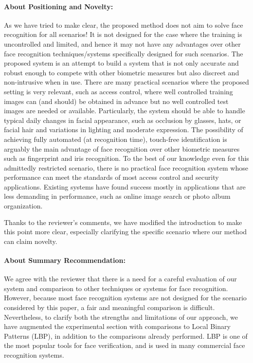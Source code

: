 \documentclass[11pt]{article}
\begin{document}
\paragraph{About Positioning and Novelty:} As we have tried to make clear, the
proposed method does not aim to solve face recognition for all scenarios! It is
not designed for the case where the training is uncontrolled and limited, and
hence it may not have any advantages over other face recognition
techniques/systems specifically designed for such scenarios.  The proposed
system is an attempt to build a system that is not only accurate and robust
enough to compete with other biometric measures but also discreet and
non-intrusive when in use. There are many practical scenarios where the
proposed setting is very relevant, such as access control, where well
controlled training images can (and should) be obtained in advance but no well
controlled test images are needed or available. Particularly, the system should
be able to handle typical daily changes in facial appearance, such as occlusion
by glasses, hats, or facial hair and variations in lighting and moderate
expression. The possibility of achieving fully automated (at recognition time),
touch-free identification is arguably the main advantage of face recognition
over other biometric measures such as fingerprint and iris recognition.  To the
best of our knowledge even for this admittedly restricted scenario, there is no
practical face recognition system whose performance can meet the standards of
most access control and security applications. Existing systems have found
success  mostly in applications that are less demanding in performance, such as
online image search or photo album organization.

Thanks to the reviewer's comments, we have modified the introduction to make this point more clear, especially clarifying the specific scenario where our method can claim novelty.

\paragraph{About Summary Recommendation:} We agree with the reviewer that there is a need for a careful evaluation of our system and comparison to other techniques or systems for face recognition. However, because most face recognition systems are not designed for the scenario considered by this paper, a fair and meaningful comparison is difficult. Nevertheless, to clarify both the strengths and limitations of our approach, we have augmented the experimental section with comparisons to Local Binary Patterns (LBP), in addition to the comparisons already performed. LBP is one of the most popular tools for face verification, and is used in many commercial face recognition systems.
\end{document}
